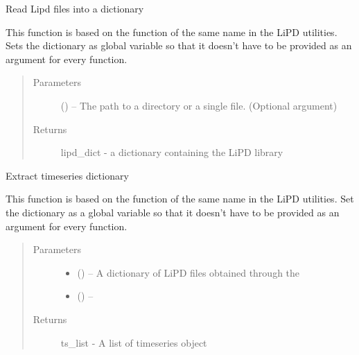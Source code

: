 \documentclass[letterpaper,10pt,english]{sphinxmanual}
\begin{document}
\begin{fulllineitems}
\label{\detokenize{Main:pyleoclim.readLipd}}
Read Lipd files into a dictionary

This function is based on the function of the same name in the LiPD utilities.
Sets the dictionary as global variable so that it doesn't have to be provided
as an argument for every function.
\begin{quote}\begin{description}
\item[{Parameters}] \leavevmode
{} () -- The path to a directory or a single file. (Optional argument)

\item[{Returns}] \leavevmode
lipd\_dict - a dictionary containing the LiPD library

\end{description}\end{quote}

\end{fulllineitems}


\begin{fulllineitems}
\label{\detokenize{Main:pyleoclim.extractTs}}
Extract timeseries dictionary

This function is based on the function of the same name in the LiPD utilities.
Set the dictionary as a global variable so that it doesn't have to be
provided as an argument for every function.
\begin{quote}\begin{description}
\item[{Parameters}] \leavevmode\begin{itemize}
\item {} 
 () -- A dictionary of LiPD files obtained through the

\item {} 
 ({\hyperref[\detokenize{Main:pyleoclim.readLipd}]{}}) -- 

\end{itemize}

\item[{Returns}] \leavevmode
ts\_list - A list of timeseries object

\end{description}\end{quote}

\end{fulllineitems}
\end{document}
